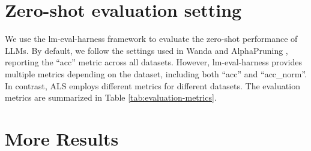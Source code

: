 \section{Zero-shot evaluation setting}\label{Zero-shotevaluationsetting}
We use the lm-eval-harness framework \citep{gao2021framework} to evaluate the zero-shot performance of LLMs. By default, we follow the settings used in Wanda \citep{sun2023simple} and AlphaPruning \citep{lu2024alphapruning}, reporting the ``acc'' metric across all datasets. However, lm-eval-harness provides multiple metrics depending on the dataset, including both ``acc'' and ``acc\_norm''. In contrast, ALS \citep{li2024adaptive} employs different metrics for different datasets. The evaluation metrics are summarized in Table \ref{tab:evaluation-metrics}.
\begin{table}[h]
    \centering
    \caption{Evaluation Metrics for Different Datasets}
    \label{tab:evaluation-metrics}
\end{table}

\section{More Results}\label{Moreresults}
